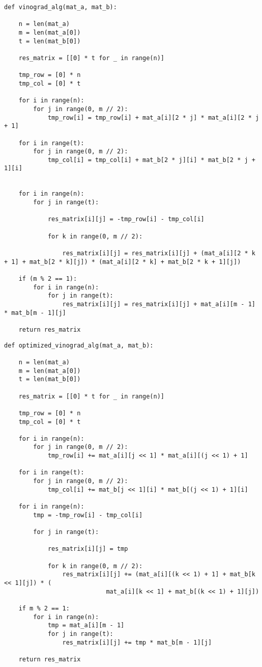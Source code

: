 \begin{center}
    \captionsetup{justification=raggedright,singlelinecheck=off}
    \begin{lstlisting}[label=lst:vin_alg,caption=Алгоритм Винограда умножения матриц]
def vinograd_alg(mat_a, mat_b):

	n = len(mat_a)
	m = len(mat_a[0])
	t = len(mat_b[0])

	res_matrix = [[0] * t for _ in range(n)]

	tmp_row = [0] * n
	tmp_col = [0] * t

	for i in range(n):
		for j in range(0, m // 2):
			tmp_row[i] = tmp_row[i] + mat_a[i][2 * j] * mat_a[i][2 * j + 1]

	for i in range(t):
		for j in range(0, m // 2):
			tmp_col[i] = tmp_col[i] + mat_b[2 * j][i] * mat_b[2 * j + 1][i] 


	for i in range(n):
		for j in range(t):

			res_matrix[i][j] = -tmp_row[i] - tmp_col[i]   

			for k in range(0, m // 2):

				res_matrix[i][j] = res_matrix[i][j] + (mat_a[i][2 * k + 1] + mat_b[2 * k][j]) * (mat_a[i][2 * k] + mat_b[2 * k + 1][j])

	if (m % 2 == 1):
		for i in range(n):
			for j in range(t):
				res_matrix[i][j] = res_matrix[i][j] + mat_a[i][m - 1] * mat_b[m - 1][j]

	return res_matrix
\end{lstlisting}
\end{center}


\begin{center}
    \captionsetup{justification=raggedright,singlelinecheck=off}
    \begin{lstlisting}[label=lst:opt_vin_alg,caption=Оптимизированный алгоритм Винограда умножения матриц]
def optimized_vinograd_alg(mat_a, mat_b):

	n = len(mat_a)
	m = len(mat_a[0])
	t = len(mat_b[0])

	res_matrix = [[0] * t for _ in range(n)]

	tmp_row = [0] * n
	tmp_col = [0] * t

	for i in range(n):
		for j in range(0, m // 2):
			tmp_row[i] += mat_a[i][j << 1] * mat_a[i][(j << 1) + 1]

	for i in range(t):
		for j in range(0, m // 2):
			tmp_col[i] += mat_b[j << 1][i] * mat_b[(j << 1) + 1][i]

	for i in range(n):
		tmp = -tmp_row[i] - tmp_col[i]

		for j in range(t):

			res_matrix[i][j] = tmp

			for k in range(0, m // 2):
				res_matrix[i][j] += (mat_a[i][(k << 1) + 1] + mat_b[k << 1][j]) * (
							mat_a[i][k << 1] + mat_b[(k << 1) + 1][j])

	if m % 2 == 1:
		for i in range(n):
			tmp = mat_a[i][m - 1]
			for j in range(t):
				res_matrix[i][j] += tmp * mat_b[m - 1][j]

	return res_matrix
\end{lstlisting}
\end{center}



